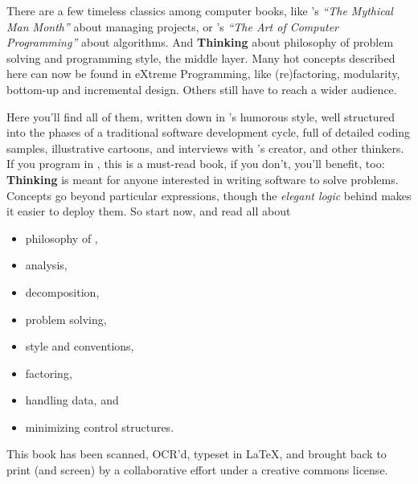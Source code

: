 
\noindent
There are a few timeless classics among computer books, like 's \emph{``The Mythical Man Month''} about managing projects, or
's \emph{``The Art of Computer Programming''} about
algorithms. And \textbf{Thinking \Forth} about philosophy of problem
solving and programming style, the middle layer. Many hot concepts
described here can now be found in eXtreme Programming, like
(re)factoring, modularity, bottom-up and incremental design. Others
still have to reach a wider audience.

Here you'll find all of them, written down in 's
humorous style, well structured into the phases of a traditional
software development cycle, full of detailed coding samples,
illustrative cartoons, and interviews with \Forth's creator,
 and other
\Forth{} thinkers. If you program in \Forth{}, this is a must-read book,
if you don't, you'll benefit, too: \textbf{Thinking \Forth{}} is meant
for anyone interested in writing software to solve problems.  Concepts
go beyond particular expressions, though the \emph{elegant logic}
behind \Forth{} makes it easier to deploy them. So start now, and read
all about
\begin{itemize}
\item philosophy of \Forth{},
\item analysis,
\item decomposition,
\item problem solving,
\item style and conventions,
\item factoring,
\item handling data, and
\item minimizing control structures.
\end{itemize}

This book has been scanned, OCR'd, typeset in \LaTeX{}, and brought
back to print (and screen) by a collaborative effort under a creative
commons license.


